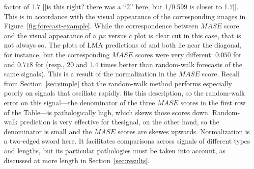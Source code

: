 factor of 1.7 [[is this right?  there was a ``2'' here, but 1/0.599 is
    closer to 1.7]].  This is in accordance with the visual appearance
of the corresponding images in Figure~\ref{fig:forecast-example}.
While the correspondence between $MASE$ score and the visual
appearance of a $px$ versus $c$ plot is clear cut in this case, that
is not always so.  The plots of LMA predictions of \col and \svdfive
both lie near the diagonal, for instance, but the corresponding $MASE$
scores were very different: $0.050$ for \col and $0.718$ for \svdfive
(resp., 20 and 1.4 times better than random-walk forecasts of the same
signals).  This is a result of the normalization in the $MASE$ score.
Recall from Section~\ref{sec:simple} that the random-walk method
performs especially poorly on signals that oscillate rapidly.  \col
fits this description, so the random-walk error on this signal---the
denominator of the three $MASE$ scores in the first row of the
Table---is pathologically high, which skews those scores down.
Random-walk prediction is very effective for the\svdfive signal, on
the other hand, so the denominator is small and the $MASE$ scores are
skewes upwards.  Normalization is a two-edged sword here.  It
facilitates comparisons across signals of different types and lengths,
but its particular pathologies must be taken into account, as
discussed at more length in Section~\ref{sec:results}.




